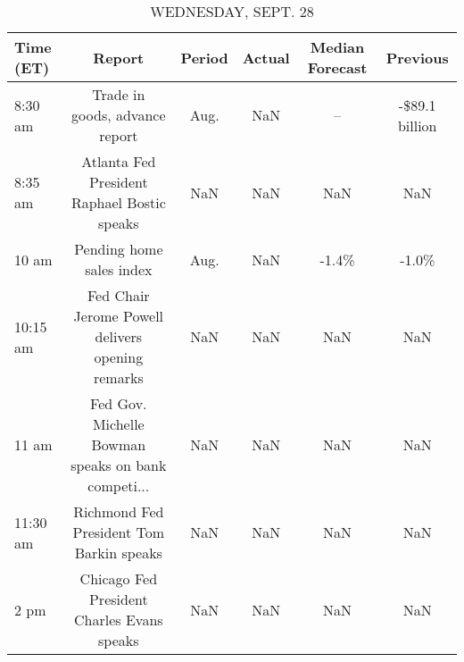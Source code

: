 \documentclass{book}
\begin{document}
  
  \begin{table}[htbp]%
  \caption{WEDNESDAY, SEPT. 28}%
  \centering%
  \begin{adjustbox}{width=1\textwidth}%
  \begin{tabular}{lccccc}
  \toprule
  Time (ET) &                                             Report & Period & Actual & Median Forecast &       Previous \\
  \midrule
    8:30 am &                     Trade in goods, advance report &   Aug. &    NaN &              -- & -\$89.1 billion \\
    8:35 am &        Atlanta Fed President Raphael Bostic speaks &    NaN &    NaN &             NaN &            NaN \\
      10 am &                           Pending home sales index &   Aug. &    NaN &           -1.4\% &          -1.0\% \\
   10:15 am &   Fed Chair Jerome Powell delivers opening remarks &    NaN &    NaN &             NaN &            NaN \\
      11 am & Fed Gov. Michelle Bowman speaks on bank competi... &    NaN &    NaN &             NaN &            NaN \\
   11:30 am &           Richmond Fed President Tom Barkin speaks &    NaN &    NaN &             NaN &            NaN \\
       2 pm &         Chicago Fed President Charles Evans speaks &    NaN &    NaN &             NaN &            NaN \\
  \bottomrule
  \end{tabular}
  \end{adjustbox}%
  \end{table}
  
  
\end{document}
